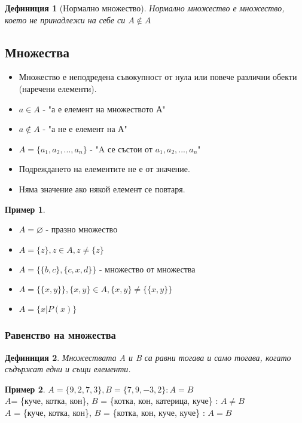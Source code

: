 \documentclass[fleqn, 12pt]{article}
\newtheorem{definition}{Дефиниция}[subsection]
\theoremstyle{definition}
\newtheorem{example}{Пример}[subsection]
\begin{document}
\begin{definition}[Нормално множество]
Нормално множество е множество, което не принадлежи на себе си $A \notin A$
\end{definition}

\subsection{Множества}
\begin{itemize} 
	\item Множество е неподредена съвокупност от нула или повече различни обекти (наречени елементи). 
 	\item $a \in A$ - "а е елемент на множеството А" 
	\item $a \notin A$ - "а не е елемент на А"
	\item $A = \{ a_1, a_2, ..., a_n\}$ - "A се състои от $a_1, a_2, ..., a_n$"
	\item Подреждането на елементите не е от значение.
	\item Няма значение ако някой елемент се повтаря. 
\end{itemize}

\begin{example}

\begin{itemize}
Примери за множества: \\
	\item $A = \varnothing$ - празно множество 
	\item $A = \{z\}, z \in A, z \neq \{z\}$
	\item $A =\{ \{b,c \}, \{c, x, d \} \}$ - множество от множества 
	\item $A = \{\{ x, y \}\}, \{x,y\} \in A, \{x,y\} \neq \{\{x,y\}\}$
	\item $A = \{x | P(x) \}$
\end{itemize}

\end{example}

\subsubsection{Равенство на множества}

\begin{definition}
Множествата A и B са равни тогава и само тогава, когато съдържат едни и същи елементи.
\end{definition}

\begin{example}
$A = \{9, 2, 7, 3\}, B = \{7, 9, -3, 2\} : A = B$\\
$A$= \{куче, котка, кон\}, $B$ = \{котка, кон, катерица, куче\} : $A\neq B$ \\
$A$ = \{куче, котка, кон\}, $B$ = \{котка, кон, куче, куче\}  : $A = B$
\end{example}
\end{document}
